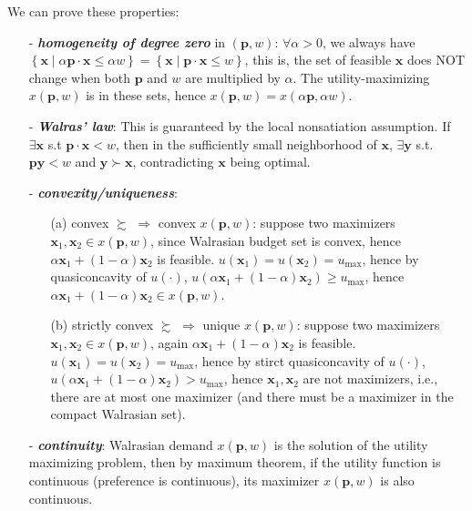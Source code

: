 We can prove these properties: 
\begin{enumerate}
    \item[-] \textit{\textbf{homogeneity of degree zero}} in $(\mathbf{p},w)$: $\forall \alpha >0$, we always have $\left\{\mathbf{x}\mid \alpha\mathbf{p}\cdot\mathbf{x}\leq \alpha w\right\}=\left\{\mathbf{x}\mid \mathbf{p}\cdot\mathbf{x}\leq w\right\}$, this is, the set of feasible $\mathbf{x}$ does NOT change when both $\mathbf{p}$ and $w$ are multiplied by $\alpha$. The utility-maximizing $ x(\mathbf{p},w)$ is in these sets, hence $ x(\mathbf{p},w)= x(\alpha\mathbf{p},\alpha w)$.
    \item[-] \textit{\textbf{Walras' law}}: This is guaranteed by the local nonsatiation assumption. If $\exists \mathbf{x}$ s.t $\mathbf{p}\cdot \mathbf{x}<w$, then in the sufficiently small neighborhood of $\mathbf{x}$, $\exists\mathbf{y}$ s.t. $\mathbf{p}\mathbf{y}<w$ and $\mathbf{y}\succ \mathbf{x}$, contradicting $\mathbf{x}$ being optimal.
    \item[-] \textit{\textbf{convexity/uniqueness}}:
    \begin{enumerate}
        \item[(a)] convex $\succsim$ $\Rightarrow$ convex $ x(\mathbf{p},w)$: suppose two maximizers $\mathbf{x}_1,\mathbf{x}_2\in x(\mathbf{p},w)$, since Walrasian budget set is convex, hence $\alpha \mathbf{x}_1+(1-\alpha)\mathbf{x}_2$ is feasible. $u(\mathbf{x}_1)=u(\mathbf{x}_2)=u_{\max}$, hence by quasiconcavity of $u(\cdot)$, $u(\alpha \mathbf{x}_1+(1-\alpha)\mathbf{x}_2)\geq u_{\max}$, hence $\alpha \mathbf{x}_1+(1-\alpha)\mathbf{x}_2\in  x(\mathbf{p},w)$.
        \item[(b)] strictly convex $\succsim$ $\Rightarrow$ unique $ x(\mathbf{p},w)$: suppose two maximizers $\mathbf{x}_1,\mathbf{x}_2\in x(\mathbf{p},w)$, again $\alpha \mathbf{x}_1+(1-\alpha)\mathbf{x}_2$ is feasible. $u(\mathbf{x}_1)=u(\mathbf{x}_2)=u_{\max}$, hence by stirct quasiconcavity of $u(\cdot)$, $u(\alpha \mathbf{x}_1+(1-\alpha)\mathbf{x}_2)> u_{\max}$, hence $\mathbf{x}_1,\mathbf{x}_2$ are not maximizers, i.e., there are at most one maximizer (and there must be a maximizer in the compact Walrasian set).
    \end{enumerate}
    \item[-] \textit{\textbf{continuity}}: Walrasian demand $ x(\mathbf{p},w)$ is the solution of the utility maximizing problem, then by maximum theorem, if the utility function is continuous (preference is continuous), its maximizer $ x(\mathbf{p},w)$ is also continuous. 
    

\end{enumerate}
